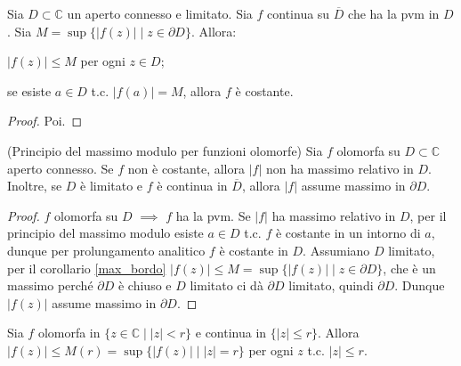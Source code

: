 \begin{cor} \label{max_bordo}
  Sia $D \subset \mathbb{C}$ un aperto connesso e limitato. Sia $f$ continua su $\overline{D}$ che ha la pvm in $D$. Sia $M=\sup\{|f(z)| \mid z \in \partial D\}$. Allora:
  \begin{nlist}
    \item $|f(z)| \le M$ per ogni $z \in D$;
    \item se esiste $a \in D$ t.c. $|f(a)|=M$, allora $f$ è costante.
  \end{nlist}
\end{cor}

\begin{proof}
  Poi.
\end{proof}

\begin{cor}
  (Principio del massimo modulo per funzioni olomorfe) Sia $f$ olomorfa su $D \subset \mathbb{C}$ aperto connesso. Se $f$ non è costante, allora $|f|$ non ha massimo relativo in $D$. Inoltre, se $D$ è limitato e $f$ è continua in $\overline{D}$, allora $|f|$ assume massimo in $\partial D$.
\end{cor}

\begin{proof}
  $f$ olomorfa su $D$ $\implies$ $f$ ha la pvm. Se $|f|$ ha massimo relativo in $D$, per il principio del massimo modulo esiste $a \in D$ t.c. $f$ è costante in un intorno di $a$, dunque per prolungamento analitico $f$ è costante in $D$.
  Assumiano $D$ limitato, per il corollario \ref{max_bordo} $|f(z)| \le M=\sup\{|f(z)| \mid z \in \partial D\}$, che è un massimo perché $\partial D$ è chiuso e $D$ limitato ci dà $\partial D$ limitato, quindi $\partial D$. Dunque $|f(z)|$ assume massimo in $\partial D$.
\end{proof}

\begin{oss}
  Sia $f$ olomorfa in $\{z \in \mathbb{C} \mid |z| <r\}$ e continua in $\{|z| \le r\}$. Allora $|f(z)| \le M(r)=\sup\{|f(z)| \mid |z|=r\}$ per ogni $z$ t.c. $|z| \le r$.
\end{oss}
